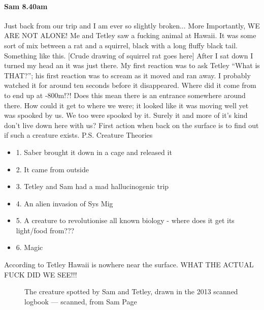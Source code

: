 \paragraph{Sam 8.40am}
Just back from our trip and I am ever so slightly broken...
More Importantly, WE ARE NOT ALONE! Me and Tetley saw a fucking animal at Hawaii. It was some sort of mix between a rat and a squirrel, black with a long fluffy black tail. Something like this. 
[Crude drawing of squirrel rat goes here]
After I sat down I turned my head an it was just there. My first reaction was to ask Tetley “What is THAT?”; his first reaction was to scream as it moved and ran away. I probably watched it for around ten seconds before it disappeared. Where did it come from to end up at -800m!?! Does this mean there is an entrance somewhere around there. How could it get to where we were; it looked like it was moving well yet was spooked by us. We too were spooked by it. Surely it and more of it’s kind don’t live down here with us? First action when back on the surface is to find out if such a creature exists.
P.S. Creature Theories
\begin{itemize}
\item 1. Saber brought it down in a cage and released it
\item 2. It came from outside
\item 3. Tetley and Sam had a mad hallucinogenic trip
\item 4. An alien invasion of Sys Mig
\item 5. A creature to revolutionise all known biology - where does it get its light/food from???
\item 6. Magic
\end{itemize}
According to Tetley Hawaii is nowhere near the surface. WHAT THE ACTUAL FUCK DID WE SEE!!!

\begin{figure}[t!]
	\checkoddpage \ifoddpage \forcerectofloat \else \forceversofloat \fi
	\centering
	\caption{The creature spotted by Sam and Tetley, drawn in the 2013 scanned logbook --- scanned, from Sam Page}
	\label{the creature}
\end{figure}

